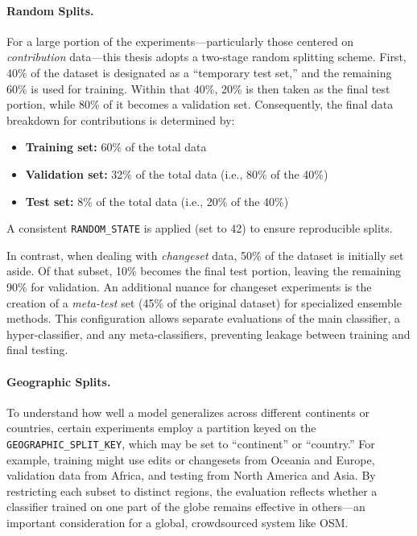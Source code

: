 \documentclass[
    13pt, %
    a4paper, %
    twoside, 
    DIV14, %
    listof=totoc, %
    bibliography=totoc, %
    index=totoc, %
    headsepline
]{scrreprt}
\begin{document}
\paragraph{Random Splits.}
For a large portion of the experiments—particularly those centered on \textit{contribution} data—this thesis adopts a two-stage random splitting scheme. First, 40\% of the dataset is designated as a “temporary test set,” and the remaining 60\% is used for training. Within that 40\%, 20\% is then taken as the final test portion, while 80\% of it becomes a validation set. Consequently, the final data breakdown for contributions is determined by:
\begin{itemize}
    \item \textbf{Training set:} 60\% of the total data
    \item \textbf{Validation set:} 32\% of the total data (i.e., 80\% of the 40\%)
    \item \textbf{Test set:} 8\% of the total data (i.e., 20\% of the 40\%)
\end{itemize}
A consistent \texttt{RANDOM\_STATE} is applied (set to 42) to ensure reproducible splits.

In contrast, when dealing with \textit{changeset} data, 50\% of the dataset is initially set aside. Of that subset, 10\% becomes the final test portion, leaving the remaining 90\% for validation. An additional nuance for changeset experiments is the creation of a \emph{meta-test} set (45\% of the original dataset) for specialized ensemble methods. This configuration allows separate evaluations of the main classifier, a hyper-classifier, and any meta-classifiers, preventing leakage between training and final testing.

\paragraph{Geographic Splits.}
To understand how well a model generalizes across different continents or countries, certain experiments employ a partition keyed on the \texttt{GEOGRAPHIC\_SPLIT\_KEY}, which may be set to “continent” or “country.” For example, training might use edits or changesets from Oceania and Europe, validation data from Africa, and testing from North America and Asia. By restricting each subset to distinct regions, the evaluation reflects whether a classifier trained on one part of the globe remains effective in others—an important consideration for a global, crowdsourced system like OSM.
\end{document}
